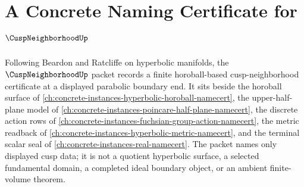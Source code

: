 \chapter{A Concrete Naming Certificate for $\CuspNeighborhoodUp$}
\label{ch:concrete-instances-cusp-neighborhood-namecert}

Following Beardon and Ratcliffe on hyperbolic manifolds, the $\CuspNeighborhoodUp$ packet records a finite horoball-based cusp-neighborhood certificate at a displayed parabolic boundary end. It sits beside the horoball surface of \autoref{ch:concrete-instances-hyperbolic-horoball-namecert}, the upper-half-plane model of \autoref{ch:concrete-instances-poincare-half-plane-namecert}, the discrete action rows of \autoref{ch:concrete-instances-fuchsian-group-action-namecert}, the metric readback of \autoref{ch:concrete-instances-hyperbolic-metric-namecert}, and the terminal scalar seal of \autoref{ch:concrete-instances-real-namecert}. The packet names only displayed cusp data; it is not a quotient hyperbolic surface, a selected fundamental domain, a completed ideal boundary object, or an ambient finite-volume theorem.

